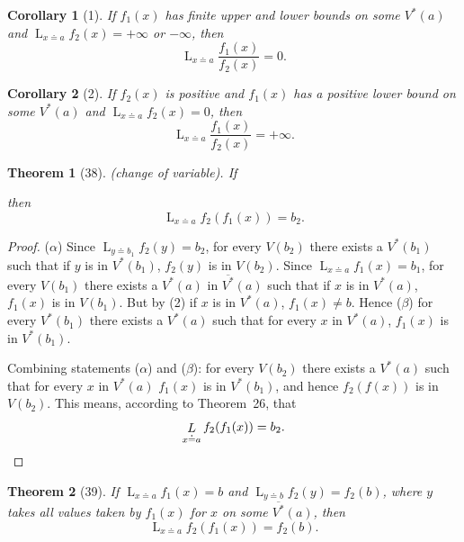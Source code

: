 \documentclass[a4paper,12pt]{book}[2004/02/16]
\providecommand{\hyperlink}[2]{#2}
\providecommand{\hypertarget}[2]{#2}
\theoremstyle{ilemma}
\theoremstyle{itheorem}
\newtheorem{theorem}{Theorem}
\theoremstyle{iother}
\theoremstyle{icorollary}
\theoremstyle{numcorollary}
\newtheorem{ncorollary}{Corollary}
\theoremstyle{idefinition}
\begin{document}
\begin{ncorollary}[1]
If $f_1(x)$ has finite upper and lower bounds on some $V^*(a)$ and
$\displaystyle \mathop{L}_{x \doteq a} f_2(x) = +\infty$ or $-\infty$,
then
\[
  \mathop{L}_{x \doteq a} \frac{f_1(x)}{f_2(x)} = 0.
\]
\end{ncorollary}
\begin{ncorollary}[2]
If $f_2(x)$ is positive and $f_1(x)$ has a positive lower bound on
some $V^*(a)$ and $\displaystyle \mathop{L}_{x \doteq a} f_2(x)=0$,
then
\[
  \mathop{L}_{x \doteq a} \frac{f_1(x)}{f_2(x)} = +\infty.
\]
\end{ncorollary}
\begin{theorem}[38]\emph{(change of variable).}\hypertarget{thm38}{} If
then
\[
 \mathop{L}_{x \doteq a} f_2(f_1(x)) = b_2.
\]
\end{theorem}

\begin{proof}
($\alpha$) Since $\displaystyle \mathop{L}_{y \doteq b_1} f_2(y)
=b_2$, for every $V(b_2)$ there exists a $V^*(b_1)$ such that if $y$
is in $V^*(b_1)$, $f_2(y)$ is in $V(b_2)$. Since $\displaystyle
\mathop{L}_{x \doteq a}f_1(x) =b_1$, for every $V(b_1)$ there exists a
$V^*(a)$ in $\overline{V^*}(a)$ such that if $x$ is in $V^*(a)$,
$f_1(x)$ is in $V(b_1)$. But by \hyperlink{item2p79}{(2)} if $x$ is in $V^*(a)$, $f_1(x)\neq
b$. Hence ($\beta$) for every $V^*(b_1)$ there exists a $V^*(a)$ such
that for every $x$ in $V^*(a)$, $f_1(x)$ is in $V^*(b_1)$.

Combining statements ($\alpha$) and ($\beta$): for every $V(b_2)$
there exists a $V^*(a)$ such that for every $x$ in $V^*(a)$ $f_1(x)$
is in $V^*(b_1)$, and hence $f_2(f(x))$ is in $V(b_2)$. This means,
according to Theorem~\hyperlink{thm26}{26}, that
\[
  \mathop{L}_{x \doteq a} f_2(f_1(x)) = b_2.\qedhere
\]
\end{proof}

\begin{theorem}[39]\hypertarget{thm39}{}
If $\displaystyle \mathop{L}_{x \doteq a} f_1(x) =b$ and
$\displaystyle \mathop{L}_{y \doteq b} f_2(y) =f_2(b)$, where $y$
takes all values taken by $f_1(x)$ for $x$ on some
$\overline{V^*}(a)$, then
\[
  \mathop{L}_{x \doteq a} f_2(f_1(x)) = f_2(b).
\]
\end{theorem}
\end{document}
